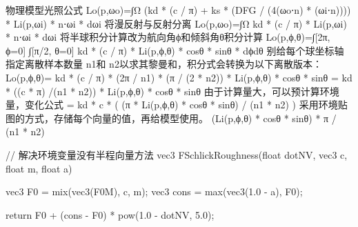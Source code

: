 
物理模型光照公式
Lo(p,ωo)=∫Ω (kd * (c / π) + ks * (DFG / (4(ωo⋅n) * (ωi⋅n)))) * Li(p,ωi) * n⋅ωi * dωi
将漫反射与反射分离
Lo(p,ωo)=∫Ω kd * (c / π) * Li(p,ωi) * n⋅ωi * dωi
将半球积分计算改为航向角ϕ和倾斜角θ积分计算 
Lo(p,ϕ,θ)=∫[2π, ϕ=0] ∫[π/2, θ=0] kd * (c / π) * Li(p,ϕ,θ) * cosθ * sinθ * dϕdθ
别给每个球坐标轴指定离散样本数量 n1和 n2以求其黎曼和，积分式会转换为以下离散版本：
Lo(p,ϕ,θ)= kd * (c / π) * (2π / n1) * (π / (2 * n2)) * Li(p,ϕ,θ) * cosθ * sinθ
         = kd * ((c * π) /(n1 * n2)) * Li(p,ϕ,θ) * cosθ * sinθ
由于计算量大，可以预计算环境量，变化公式
         = kd * c * ( (π * Li(p,ϕ,θ) * cosθ * sinθ) / (n1 * n2) )
采用环境贴图的方式，存储每个向量的值，再给模型使用。
  (Li(p,ϕ,θ) * cosθ * sinθ) * π / (n1 * n2)


  // 解决环境变量没有半程向量方法
  vec3 FSchlickRoughness(float dotNV, vec3 c, float m, float a) {
    vec3 F0 = mix(vec3(F0M), c, m);
    vec3 cons = max(vec3(1.0 - a), F0);
  
    return F0 + (cons - F0) * pow(1.0 - dotNV, 5.0);
  }
  
